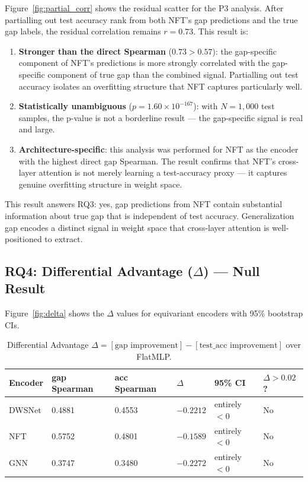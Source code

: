 Figure~\ref{fig:partial_corr} shows the residual scatter for the P3 analysis. After
partialling out test accuracy rank from both NFT's gap predictions and the true gap labels, the
residual correlation remains $r = 0.73$. This result is:

\begin{enumerate}
\item \textbf{Stronger than the direct Spearman} ($0.73 > 0.57$): the gap-specific component of NFT's
   predictions is more strongly correlated with the gap-specific component of true gap than the
   combined signal. Partialling out test accuracy isolates an overfitting structure that NFT captures
   particularly well.

\item \textbf{Statistically unambiguous} ($p = 1.60 \times 10^{-167}$): with $N = 1{,}000$ test samples, the p-value is
   not a borderline result --- the gap-specific signal is real and large.

\item \textbf{Architecture-specific}: this analysis was performed for NFT as the encoder with the highest
   direct gap Spearman. The result confirms that NFT's cross-layer attention is not merely learning
   a test-accuracy proxy --- it captures genuine overfitting structure in weight space.
\end{enumerate}

This result answers RQ3: yes, gap predictions from NFT contain substantial information about true gap
that is independent of test accuracy. Generalization gap encodes a distinct signal in weight space that
cross-layer attention is well-positioned to extract.

\subsection{RQ4: Differential Advantage ($\Delta$) --- Null Result}

Figure~\ref{fig:delta} shows the $\Delta$ values for equivariant encoders with 95\% bootstrap CIs.

\begin{table}[h]
\centering
\caption{Differential Advantage $\Delta = [\text{gap improvement}] - [\text{test\_acc improvement}]$ over FlatMLP.}
\label{tab:delta}
\begin{tabular}{@{}llllll@{}}
\toprule
Encoder & gap Spearman & acc Spearman & $\Delta$ & 95\% CI & $\Delta > 0.02$? \\
\midrule
DWSNet & 0.4881 & 0.4553 & $-0.2212$ & entirely $< 0$ & No \\
NFT    & 0.5752 & 0.4801 & $-0.1589$ & entirely $< 0$ & No \\
GNN    & 0.3747 & 0.3480 & $-0.2272$ & entirely $< 0$ & No \\
\bottomrule
\end{tabular}
\end{table}


